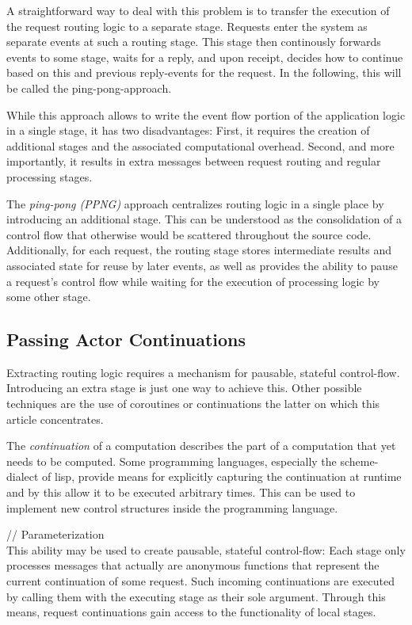 \documentclass{sig-alternate}
\begin{document}
A straightforward way to deal with this problem is to transfer the execution of the request routing
logic to a separate stage. Requests enter the system as separate events at such a routing stage.
This stage then continously forwards events to some stage, waits for a reply, and upon receipt,
decides how to continue based on this and previous reply-events for the request. In the following,
this will be called the ping-pong-approach.

While this approach allows to write the event flow portion of the application logic in a single
stage, it has two disadvantages: First, it requires the creation of additional stages and the
associated computational overhead. Second, and more importantly, it results in extra messages
between request routing and regular processing stages.

The \emph{ping-pong (PPNG)} approach centralizes routing logic in a single place by introducing an
additional stage. This can be understood as the consolidation of a control flow that otherwise would
be scattered throughout the source code. Additionally, for each request, the routing stage stores
intermediate results and associated state for reuse by later events, as well as provides the ability
to pause a request's control flow while waiting for the execution of processing logic by some other
stage.



\subsection{Passing Actor Continuations}

Extracting routing logic requires a mechanism for pausable, stateful control-flow. Introducing an
extra stage is just one way to achieve this. Other possible techniques are the use of coroutines or
continuations the latter on which this article concentrates.

The \emph{continuation} of a computation describes the part of a computation that yet needs to be
computed. Some programming languages, especially the scheme-dialect of lisp, provide means for
explicitly capturing the continuation at runtime and by this allow it to be executed arbitrary
times. This can be used to implement new control structures inside the programming language.

// Parameterization\\

This ability may be used to create pausable, stateful control-flow: Each stage only processes
messages that actually are anonymous functions that represent the current continuation of some
request. Such incoming continuations are executed by calling them with the executing stage as their
sole argument. Through this means, request continuations gain access to the functionality of local
stages.
\end{document}
